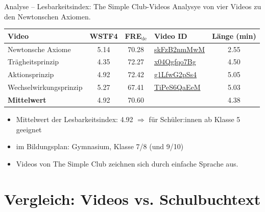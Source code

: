 \documentclass[a4paper,10pt,
headsepline,           %
oneside,               %
pointlessnumbers,      %
bibtotoc,              %
DIV=15,               %
]{scrbook}
\begin{document}
\begin{example}{Analyse -- Lesbarkeitsindex: \glqq The Simple Club\grqq{}-Videos}
    Analysye von vier Videos zu den Newtonschen Axiomen.
    \begin{center}

		\begin{tabular}{|l|c|c|l|c|}
			\hline
			\textbf{Video} & \textbf{WSTF4} & \textbf{FRE}$_{\mathrm{de}}$ & \textbf{Video ID} & Länge (min) \\
			\hline
Newtonsche Axiome & 5.14 & 70.28  & \href{https://www.youtube.com/watch?v=skFzB2nmMwM}{skFzB2nmMwM} & 2.55 \\
			\hline
Trägheitsprinzip  & 4.35     & 72.27 & \href{https://www.youtube.com/watch?v=x04Qgfqo7Bg}{x04Qgfqo7Bg} & 4.50 \\
			\hline
Aktionsprinzip    & 4.92 & 72.42  & \href{https://www.youtube.com/watch?v=g1LfwG2pSs4}{g1LfwG2pSs4} & 5.05 \\
			\hline
Wechselwirkungsprinzip & 5.27 & 67.41  & \href{https://www.youtube.com/watch?v=TiPeS6QaEeM}{TiPeS6QaEeM} & 5.03  \\
			\hline
			\hline
\textbf{Mittelwert} & 4.92  & 70.60 & & 4.38 \\
			\hline
		\end{tabular}
	\end{center}

\begin{itemize}
		\item Mittelwert der Lesbarkeitsindex: 4.92 $\Rightarrow$ für Schüler:innen ab Klasse 5 geeignet
		\item im Bildungsplan: Gymnasium, Klasse 7/8 (und 9/10)
		\item Videos von The Simple Club zeichnen sich durch einfache Sprache aus.
	\end{itemize}

\end{example}

	

\newpage
\section*{Vergleich: Videos vs. Schulbuchtext}
\end{document}

